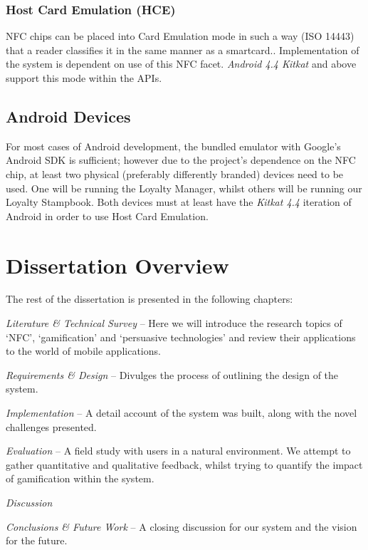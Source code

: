 \subsubsection{Host Card Emulation (HCE)}
\label{sec:initalHCE}
NFC chips can be placed into Card Emulation mode in such a way (ISO 14443) that a reader classifies it in the same manner as a smartcard.\cite{ecosystem}. Implementation of the system is dependent on use of this NFC facet. \emph{Android 4.4 Kitkat} and above support this mode within the APIs.
\subsection{Android Devices}
For most cases of Android development, the bundled emulator with Google's Android SDK is sufficient; however due to the project's dependence on the NFC chip, at least two physical (preferably differently branded) devices need to be used. One will be running the Loyalty Manager, whilst others will be running our Loyalty Stampbook. Both devices must at least have the \emph{Kitkat 4.4} iteration of Android in order to use Host Card Emulation.

\section{Dissertation Overview}
The rest of the dissertation is presented in the following chapters:
\begin{description}[leftmargin=!,labelwidth=\widthof{\bfseries Medium}]
    \item[Chapter 2] \emph{Literature \& Technical Survey} -- Here we will introduce the research topics of `NFC', `gamification' and `persuasive technologies' and review their applications to the world of mobile applications. 
    \item[Chapter 3] \emph{Requirements \& Design} -- Divulges the process of outlining the design of the system.
    \item[Chapter 4] \emph{Implementation} -- A detail account of the system was built, along with the novel challenges presented. 
    \item[Chapter 5] \emph{Evaluation} -- A field study with users in a natural environment. We attempt to gather quantitative and qualitative feedback, whilst trying to quantify the impact of gamification within the system. 
    \item[Chapter 6] \emph{Discussion}
    \item[Chapter 7] \emph{Conclusions \& Future Work} -- A closing discussion for our system and the vision for the future. 
\end{description}